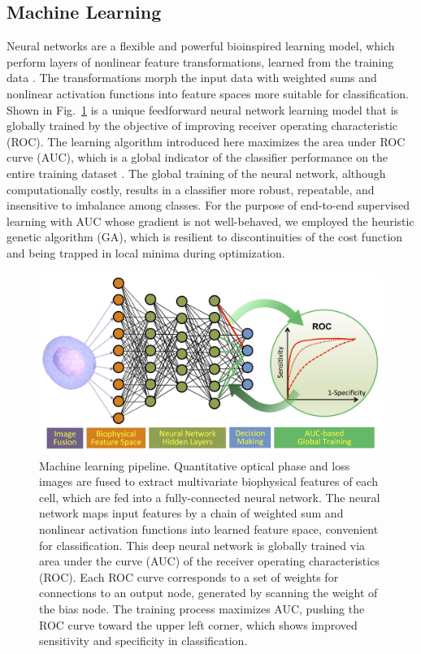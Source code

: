 \documentclass[aps,pra,reprint,superscriptaddress]{revtex4-1}
\begin{document}
\subsection*{Machine Learning}

Neural networks are a flexible and powerful bioinspired learning model, which perform layers of nonlinear feature transformations, learned from the training data \cite{abu2012learning, bishop2006pattern, boddy1994neural}. The transformations morph the input data with weighted sums and nonlinear activation functions into feature spaces more suitable for classification. Shown in Fig.~\ref{fig:NeuralNet} is a unique feedforward neural network learning model that is globally trained by the objective of improving receiver operating characteristic (ROC). The learning algorithm introduced here maximizes the area under ROC curve (AUC), which is a global indicator of the classifier performance on the entire training dataset \cite{bradley1997use, powers2007evaluation, huang2005using}. The global training of the neural network, although computationally costly, results in a classifier more robust, repeatable, and insensitive to imbalance among classes. For the purpose of end-to-end supervised learning with AUC whose gradient is not well-behaved, we employed the heuristic genetic algorithm (GA), which is resilient to discontinuities of the cost function and being trapped in local minima during optimization.

\begin{figure}
\includegraphics[scale=0.08]{FigureNeuralNet.jpg}
\caption{\label{fig:NeuralNet} Machine learning pipeline. Quantitative optical phase and loss images are fused to extract multivariate biophysical features of each cell, which are fed into a fully-connected neural network. The neural network maps input features by a chain of weighted sum and nonlinear activation functions into learned feature space, convenient for classification. This deep neural network is globally trained via area under the curve (AUC) of the receiver operating characteristics (ROC). Each ROC curve corresponds to a set of weights for connections to an output node, generated by scanning the weight of the bias node. The training process maximizes AUC, pushing the ROC curve toward the upper left corner, which shows improved sensitivity and specificity in classification.}
\end{figure}
\end{document}

